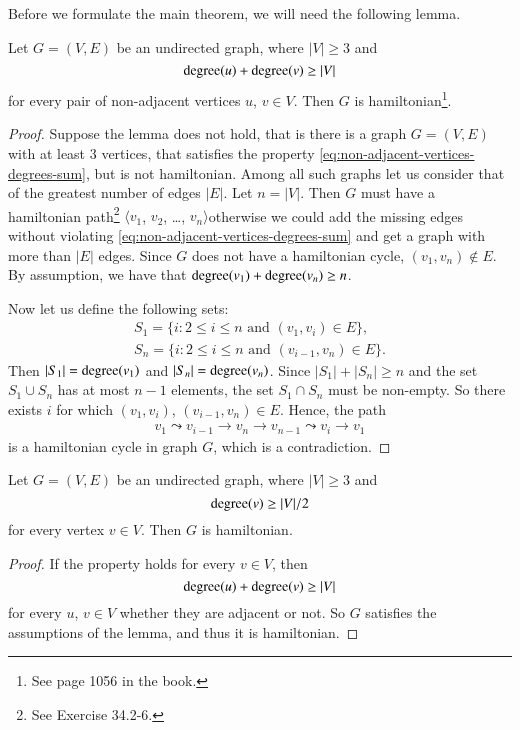 \subproblem
Before we formulate the main theorem, we will need the following lemma.
\begin{lemma}
    Let $G=(V,E)$ be an undirected graph, where $|V|\ge3$ and
    \begin{equation} \label{eq:non-adjacent-vertices-degrees-sum}
        \operatorname{degree}(u)+\operatorname{degree}(v) \ge |V|
    \end{equation}
    for every pair of non-adjacent vertices $u$, $v\in V$.
    Then $G$ is hamiltonian\footnote{See page 1056 in the book.}.
\end{lemma}

\begin{proof}
    Suppose the lemma does not hold, that is there is a graph $G=(V,E)$ with at least 3 vertices, that satisfies the property \eqref{eq:non-adjacent-vertices-degrees-sum}, but is not hamiltonian.
    Among all such graphs let us consider that of the greatest number of edges $|E|$.
    Let $n=|V|$.
    Then $G$ must have a hamiltonian path\footnote{See Exercise 34.2-6.} $\langle v_1$, $v_2$, \dots, $v_n\rangle$\dash otherwise we could add the missing edges without violating \eqref{eq:non-adjacent-vertices-degrees-sum} and get a graph with more than $|E|$ edges.
    Since $G$ does not have a hamiltonian cycle, $(v_1,v_n)\notin E$.
    By assumption, we have that $\operatorname{degree}(v_1)+\operatorname{degree}(v_n)\ge n$.

    Now let us define the following sets:
    \begin{gather*}
        S_1 = \{i: 2\le i\le n \text{ and } (v_1,v_i)\in E\}, \\
        S_n = \{i: 2\le i\le n \text{ and } (v_{i-1},v_n)\in E\}.
    \end{gather*}
    Then $|S_1|=\operatorname{degree}(v_1)$ and $|S_n|=\operatorname{degree}(v_n)$.
    Since $|S_1|+|S_n|\ge n$ and the set $S_1\cup S_n$ has at most $n-1$ elements, the set $S_1\cap S_n$ must be non-empty.
    So there exists $i$ for which $(v_1,v_i)$, $(v_{i-1},v_n)\in E$.
    Hence, the path
    \begin{align*}
        v_1\leadsto v_{i-1}\to v_n\to v_{n-1}\leadsto v_i\to v_1
    \end{align*}
    is a hamiltonian cycle in graph $G$, which is a contradiction.
\end{proof}

\begin{theorem}
    Let $G=(V,E)$ be an undirected graph, where $|V|\ge3$ and
    \[
        \operatorname{degree}(v) \ge |V|/2
    \]
    for every vertex $v\in V$.
    Then $G$ is hamiltonian.
\end{theorem}

\begin{proof}
    If the property holds for every $v\in V$, then
    \[
        \operatorname{degree}(u)+\operatorname{degree}(v) \ge |V|
    \]
    for every $u$, $v\in V$ whether they are adjacent or not.
    So $G$ satisfies the assumptions of the lemma, and thus it is hamiltonian.
\end{proof}
